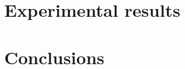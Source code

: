 
\section{Experimental results}
\label{sec:be:experimental_results}


\section{Conclusions}
\label{sec:be:conclusion}
